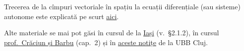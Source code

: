 Trecerea de la cîmpuri vectoriale în spațiu la ecuații diferențiale (sau sisteme)
autonome este explicată pe scurt \href{http://www.math.tamu.edu/~zelenko/308\_w3\_qual.pdf}{aici}.


\vspace{1cm}

Alte materiale se mai pot găsi în cursul de la \href{http://www.mec.tuiasi.ro/diverse/matematici\_speciale.pdf}{Iași} (v.\ \S2.1.2),
în cursul \href{http://www.edumanager.ro/community/documente/ecuatii\_cu\_derivate\_partiale\_de\_ordinul\_al\_doilea.pdf}{prof.\ Crăciun și Barbu} (cap.\ 2)
și în \href{https://www.yumpu.com/ro/document/read/17874390/ecuatii-diferentiale-n-forma-simetrica-integrale-prime}{aceste notițe} de la UBB Cluj.

